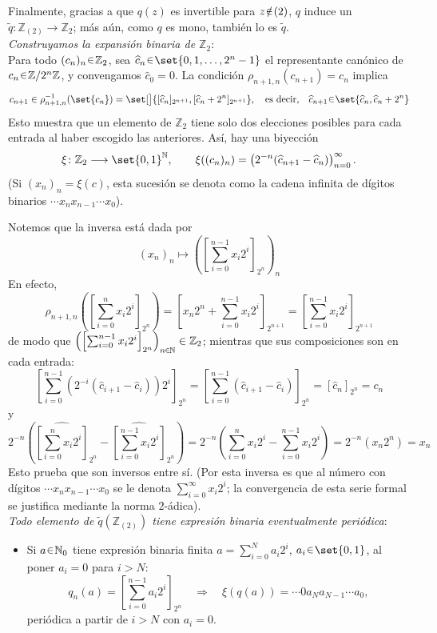 \begin{sol}
Finalmente, gracias a que $q(z)$ es invertible para $z\noten(2)$, $q$ induce un $\widetilde q\colon\mathbb{Z}_{(2)}\to\mathbb{Z}_2$; más aún, como $q$ es mono, también lo es $\widetilde q$.
\vspace{1em}\\
\emph{Construyamos la expansión binaria de $\mathbb{Z}_2$}:\\ 
Para todo $(c_n)_n\en\mathbb{Z}_2$, sea $\widehat c_n\en\set{0,1,\ldots,2^n-1}$ el
representante canónico de $c_n\en\mathbb{Z}/2^n\mathbb{Z}$, y convengamos $\widehat c_0=0$. La condición
$\rho_{n+1,n}(c_{n+1})=c_n$ implica
\[
c_{n+1} \in \rho^{-1}_{n+1,n}(\set{c_n}) = \set[\big]{[\widehat c_n]_{2^{n+1}},[\widehat c_n + 2^n]_{2^{n+1}}},
\quad\text{es decir,}\quad
\widehat c_{n+1}\en\set{\widehat c_n,\widehat c_n+2^n}
\]
Esto muestra que un elemento de $\mathbb{Z}_2$ tiene solo dos elecciones
posibles para cada entrada al haber escogido las anteriores. Así, hay una
biyección
\[
\xi\colon\mathbb{Z}_2\longrightarrow\set{0,1}^{\mathbb{N}},
\qquad
\xi((c_n)_n)=\left(2^{-n}(\widehat c_{n+1}-\widehat c_n)\right)_{n=0}^{\infty}.
\]
(Si $(x_n)_n=\xi(c)$, esta sucesión se denota como la cadena infinita de dígitos binarios $\cdots x_nx_{n-1}\cdots x_0$).

Notemos que la inversa está dada por
\[
(x_n)_n\longmapsto
\left(\left[\sum_{i=0}^{n-1}x_i2^i\right]_{2^n}\right)_n
\]
En efecto,
\[
\rho_{n+1,n}\left(\left[ \sum_{i=0}^{n}x_i2^i \right]_{2^{n}}\right)
=\left[ x_n2^n+\sum_{i=0}^{n-1}x_i2^i \right]_{2^{n+1}}
=\left[ \sum_{i=0}^{n-1}x_i2^i \right]_{2^{n+1}}
\]
de modo que $\left(\left[\sum_{i=0}^{n-1}x_i2^i\right]_{2^n}\right)_{n\en\mathbb{N}}\in\mathbb{Z}_2$; mientras que sus composiciones son en cada entrada:
\[
\left[ \sum_{i=0}^{n-1}\left(2^{-i}(\widehat c_{i+1}-\widehat c_i)\right)2^i \right]_{2^n}
= \left[ \sum_{i=0}^{n-1}(\widehat c_{i+1}-\widehat c_i) \right]_{2^{n}} 
= \left[ \widehat c_n \right]_{2^{n}} = c_n
\]
y
\[
2^{-n}\left( \hat{\left[\sum_{i=0}^{n}x_i2^i\right]}_{2^{n}} - \hat{\left[\sum_{i=0}^{n-1}x_i2^i\right]}_{2^{n}}\right)
= 2^{-n}\left( \sum_{i=0}^{n}x_i2^i - \sum_{i=0}^{n-1}x_i2^i\right)
=2^{-n}(x_n2^n)=x_n
\]
Esto prueba que son inversos entre sí. (Por esta inversa es que al número con dígitos $\cdots x_nx_{n-1}\cdots x_0$ se le denota $\sum_{i=0}^{\infty}x_i2^i$; la convergencia de esta serie formal se justifica mediante la norma $2$-ádica).
\vspace{1em}\\ 
\emph{Todo elemento de $\widetilde q(\mathbb{Z}_{(2)})$ tiene expresión binaria eventualmente periódica}:
\begin{itemize}
    \item Si $a\en\mathbb{N}_0$ tiene expresión binaria finita $a=\sum_{i=0}^{N}a_i2^i$, $a_i\en\set{0,1}$, al poner $a_i=0$ para $i>N$:
    \[
    q_n(a)=\left[\sum_{i=0}^{n-1}a_i2^i\right]_{2^{n}}
    \quad\Longrightarrow\quad
    \xi(q(a))=\cdots 0a_Na_{N-1}\cdots a_0,
    \]
    periódica a partir de $i>N$ con $a_i=0$.


\end{itemize}
\end{sol}
